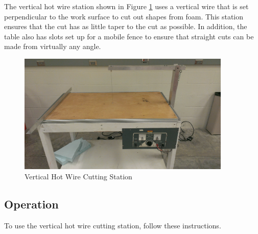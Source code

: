 The vertical hot wire station shown in Figure \ref{fig:verthotwire} uses a vertical wire that is set perpendicular to the work surface to cut out shapes from foam. This station ensures that the cut has as little taper to the cut as possible. In addition, the table also has slots set up for a mobile fence to ensure that straight cuts can be made from virtually any angle.

\begin{figure}[ht]
\centering
\includegraphics[width=4in]{images/IMAG0198}
\caption{Vertical Hot Wire Cutting Station}
\label{fig:verthotwire}
\end{figure}

\subsection{Operation}
To use the vertical hot wire cutting station, follow these instructions.


